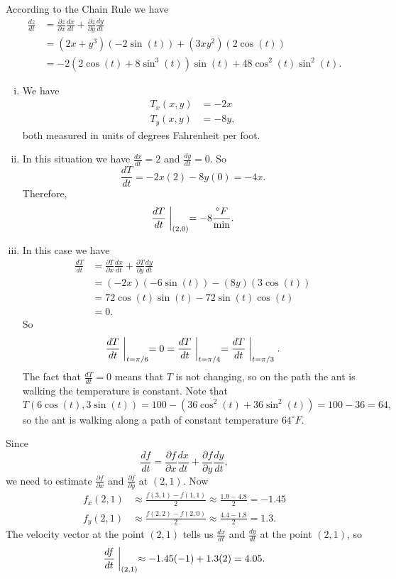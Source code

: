 \begin{activitySolution}
\ba
\item According to the Chain Rule we have 
\begin{align*}
\frac{dz}{dt} &= \frac{\partial z}{\partial x} \frac{dx}{dt} + \frac{\partial z}{\partial y} \frac{dy}{dt} \\
	&= (2x+y^3)(-2\sin(t)) + (3xy^2)(2\cos(t)) \\
	&= -2(2\cos(t)+8\sin^3(t))\sin(t) + 48 \cos^2(t)\sin^2(t).
\end{align*}

\item 
	\begin{enumerate}[i.]
	\item We have
\begin{align*}
T_x(x,y) &= -2x \\
T_y(x,y) &= -8y,
\end{align*}
both measured in units of degrees Fahrenheit per foot. 
	\item In this situation we have $\frac{dx}{dt} = 2$ and $\frac{dy}{dt} = 0$. So 
\[\frac{dT}{dt} = -2x(2) -8y(0) = -4x.\]
Therefore, 
\[\frac{dT}{dt}\biggm|_{(2,0)} = -8 \frac{^{\circ}F}{\text{min}}.\]
	\item In this case we have 
\begin{align*}
\frac{dT}{dt} &= \frac{\partial T}{\partial x} \frac{dx}{dt} + \frac{\partial T}{\partial y} \frac{dy}{dt} \\	
	&= (-2x)(-6\sin(t)) - (8y)(3\cos(t)) \\
	&= 72\cos(t)\sin(t) - 72 \sin(t)\cos(t) \\
	&= 0.
\end{align*}
So
\[\frac{dT}{dt}\biggm|_{t=\pi/6} = 0 = \frac{dT}{dt}\biggm|_{t=\pi/4} =\frac{dT}{dt}\biggm|_{t=\pi/3}.\]
The fact that $\frac{dT}{dt} = 0$ means that $T$ is not changing, so on the path the ant is walking the temperature is constant. Note that 
\[T(6\cos(t), 3\sin(t)) = 100 - (36\cos^2(t) + 36\sin^2(t)) = 100-36 = 64,\]
so the ant is walking along a path of constant temperature $64^{\circ}F$. 
	\end{enumerate}
\item Since 
\[\frac{df}{dt}= \frac{\partial f}{\partial x} \frac{dx}{dt} + \frac{\partial f}{\partial y} \frac{dy}{dt},\]
we need to estimate $\frac{\partial f}{\partial x}$ and $\frac{\partial f}{\partial y}$ at $(2,1)$. Now
\begin{align*}
f_x(2,1) &\approx \frac{f(3,1) - f(1,1)}{2} \approx \frac{1.9-4.8}{2} = -1.45 \\
f_y(2,1) &\approx \frac{f(2,2) - f(2,0)}{2} \approx \frac{4.4-1.8}{2} = 1.3.
\end{align*}
The velocity vector at the point $(2,1)$ tells us $\frac{dx}{dt}$ and $\frac{dy}{dt}$ at the point $(2,1)$, so 
\[\frac{df}{dt}\biggm|_{(2,1)} \approx -1.45(-1) + 1.3(2) = 4.05.\]

\ea
\end{activitySolution}
\afterpa 